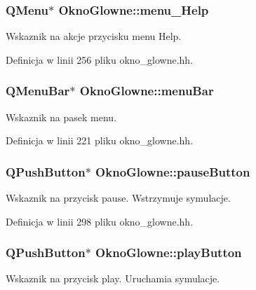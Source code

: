 \subsubsection[{menu\+\_\+\+Help}]{\setlength{\rightskip}{0pt plus 5cm}Q\+Menu$\ast$ Okno\+Glowne\+::menu\+\_\+\+Help\hspace{0.3cm}{\ttfamily [private]}}\label{class_okno_glowne_ab17be6714913af0cdf4e7de7cb6210d1}
Wskaznik na akcje przycisku menu Help. 

Definicja w linii 256 pliku okno\+\_\+glowne.\+hh.

\hypertarget{class_okno_glowne_a5a87098d9d4bd868670f5a5e72023a0a}{}
\subsubsection[{menu\+Bar}]{\setlength{\rightskip}{0pt plus 5cm}Q\+Menu\+Bar$\ast$ Okno\+Glowne\+::menu\+Bar\hspace{0.3cm}{\ttfamily [private]}}\label{class_okno_glowne_a5a87098d9d4bd868670f5a5e72023a0a}
Wskaznik na pasek menu. 

Definicja w linii 221 pliku okno\+\_\+glowne.\+hh.

\hypertarget{class_okno_glowne_a0dde8df8a49b8f47f17f8e748fd15967}{}
\subsubsection[{pause\+Button}]{\setlength{\rightskip}{0pt plus 5cm}Q\+Push\+Button$\ast$ Okno\+Glowne\+::pause\+Button\hspace{0.3cm}{\ttfamily [private]}}\label{class_okno_glowne_a0dde8df8a49b8f47f17f8e748fd15967}
Wskaznik na przycisk pause. Wstrzymuje symulacje. 

Definicja w linii 298 pliku okno\+\_\+glowne.\+hh.

\hypertarget{class_okno_glowne_a50f936486c1bc3b3278823a8eb90841e}{}
\subsubsection[{play\+Button}]{\setlength{\rightskip}{0pt plus 5cm}Q\+Push\+Button$\ast$ Okno\+Glowne\+::play\+Button\hspace{0.3cm}{\ttfamily [private]}}\label{class_okno_glowne_a50f936486c1bc3b3278823a8eb90841e}
Wskaznik na przycisk play. Uruchamia symulacje. 

